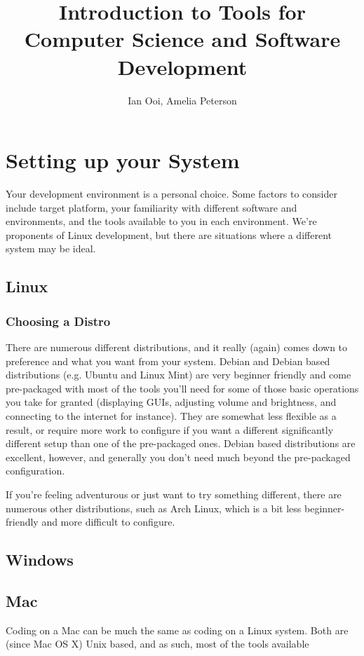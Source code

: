 \documentclass[12pt]{book}
\title{Introduction to Tools for Computer Science and Software Development}
\author{Ian Ooi, Amelia Peterson}
\begin{document}
	\begin{titlepage}
		\maketitle
	\end{titlepage}
	\tableofcontents
	
	\section{Setting up your System}
		Your development environment is a personal choice.  Some factors to consider include target platform, your familiarity with different software and environments, and the tools available to you in each environment.  We're proponents of Linux development, but there are situations where a different system may be ideal.
		\subsection{Linux}
			\subsubsection{Choosing a Distro}
				There are numerous different distributions, and it really (again) comes down to preference and what you want from your system.  Debian and Debian based distributions (e.g. Ubuntu and Linux Mint) are very beginner friendly and come pre-packaged with most of the tools you'll need for some of those basic operations you take for granted (displaying GUIs, adjusting volume and brightness, and connecting to the internet for instance).  They are somewhat less flexible as a result, or require more work to configure if you want a different significantly different setup than one of the pre-packaged ones.  Debian based distributions are excellent, however, and generally you don't need much beyond the pre-packaged configuration.
				
				If you're feeling adventurous or just want to try something different, there are numerous other distributions, such as Arch Linux, which is a bit less beginner-friendly and more difficult to configure.  
		\subsection{Windows}
			
		\subsection{Mac}
			Coding on a Mac can be much the same as coding on a Linux system.  Both are (since Mac OS X) Unix based, and as such, most of the tools available 
			
\end{document}
